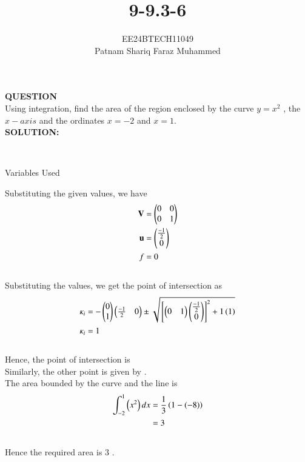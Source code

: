 \documentclass[journal]{IEEEtran}
\numberwithin{equation}{enumi}
\numberwithin{figure}{enumi}
\begin{document}


\title{9-9.3-6}
\author{EE24BTECH11049 \\ Patnam Shariq Faraz Muhammed}

{\let\newpage\relax\maketitle}

\textbf{QUESTION} \\
    Using integration, find the area of the region enclosed by the curve $y = x^2$ , the $x-axis$ and the ordinates $x = - 2$ and $x = 1$.\\
\textbf{SOLUTION:} \\
    \begin{table}[h!]    
      \centering
      
      \label{table: 9-9.3-6}
    \end{table}\\

    \begin{table}[h!]    
      \centering
      
      \caption{Variables Used}
      \label{table: 9-9.3-6}
    \end{table}
    Substituting the given values, we have \\
\begin{align}
	\mathbf{V} &= \begin{pmatrix} 0 & 0 \\ 0 & 1 \end{pmatrix} \\
	\mathbf{u} &= \begin{pmatrix} \frac{-1}{2} \\ 0 \end{pmatrix} \\
	f &= 0 
\end{align}\\
Substituting the values, we get the point of intersection as \\
\begin{align}
	\kappa_i &= -\begin{pmatrix}0 \\ 1\end{pmatrix}\begin{pmatrix}\frac{-1}{2} & 0\end{pmatrix} \pm \sqrt{{}\left[\begin{pmatrix}0 & 1\end{pmatrix}\begin{pmatrix} \frac{-1}{2} \\ 0\end{pmatrix} \right]^2 + 1\left(1\right)} \\
	\kappa_i &= 1 
\end{align}\\
Hence, the point of intersection is  \\
Similarly, the other point is given by  .\\
The area bounded by the curve and the line is \\
\begin{align}
	\int_{-2}^{1} \left(x^2\right) dx &= \frac{1}{3}\left( 1 - (-8) \right) \\
	&= 3 
\end{align}\\
Hence the required area is $3$ .
	
\end{document}
